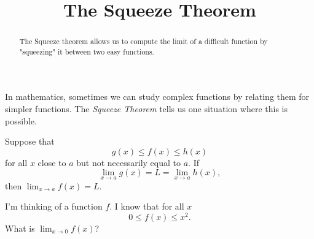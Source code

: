 \documentclass{ximera}
\title[Dig-In:]{The Squeeze Theorem}
\begin{document}
\begin{abstract}
The Squeeze theorem allows us to compute the limit of a difficult function by "squeezing" it between two easy functions.
\end{abstract}
\maketitle

In mathematics, sometimes we can study complex functions by relating 
them for simpler functions.  The \textit{Squeeze Theorem} tells us one
situation where this is possible.

\begin{theorem}
  Suppose that
  \[
  g(x) \le f(x) \le h(x)
  \]
  for all $x$ close to $a$ but not necessarily equal to $a$. If
  \[
  \lim_{x\to a} g(x) = L = \lim_{x\to a} h(x),
  \]
  then $\lim_{x\to a} f(x) = L$.
\end{theorem}

\begin{question}
  I'm thinking of a function $f$. I know that for all $x$
  \[
  0 \le f(x) \le x^2.
  \]
  What is $\lim_{x\to 0} f(x)$?
  \begin{prompt}
  \begin{multipleChoice}
  \end{multipleChoice}
  \end{prompt}
\end{question}
\end{document}
